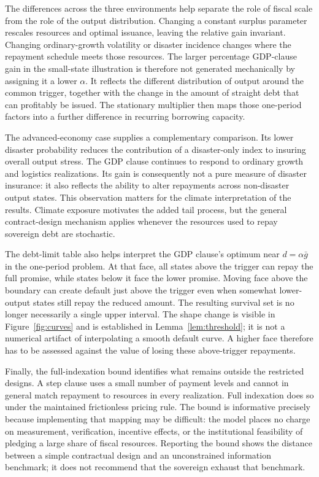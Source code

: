 The differences across the three environments help separate the role of fiscal scale from the role of the output distribution. Changing a constant surplus parameter rescales resources and optimal issuance, leaving the relative gain invariant. Changing ordinary-growth volatility or disaster incidence changes where the repayment schedule meets those resources. The larger percentage GDP-clause gain in the small-state illustration is therefore not generated mechanically by assigning it a lower $\alpha$. It reflects the different distribution of output around the common trigger, together with the change in the amount of straight debt that can profitably be issued. The stationary multiplier then maps those one-period factors into a further difference in recurring borrowing capacity.

The advanced-economy case supplies a complementary comparison. Its lower disaster probability reduces the contribution of a disaster-only index to insuring overall output stress. The GDP clause continues to respond to ordinary growth and logistics realizations. Its gain is consequently not a pure measure of disaster insurance: it also reflects the ability to alter repayments across non-disaster output states. This observation matters for the climate interpretation of the results. Climate exposure motivates the added tail process, but the general contract-design mechanism applies whenever the resources used to repay sovereign debt are stochastic.

The debt-limit table also helps interpret the GDP clause's optimum near $d=\alpha\bar g$ in the one-period problem. At that face, all states above the trigger can repay the full promise, while states below it face the lower promise. Moving face above the boundary can create default just above the trigger even when somewhat lower-output states still repay the reduced amount. The resulting survival set is no longer necessarily a single upper interval. The shape change is visible in Figure~\ref{fig:curves} and is established in Lemma~\ref{lem:threshold}; it is not a numerical artifact of interpolating a smooth default curve. A higher face therefore has to be assessed against the value of losing these above-trigger repayments.

Finally, the full-indexation bound identifies what remains outside the restricted designs. A step clause uses a small number of payment levels and cannot in general match repayment to resources in every realization. Full indexation does so under the maintained frictionless pricing rule. The bound is informative precisely because implementing that mapping may be difficult: the model places no charge on measurement, verification, incentive effects, or the institutional feasibility of pledging a large share of fiscal resources. Reporting the bound shows the distance between a simple contractual design and an unconstrained information benchmark; it does not recommend that the sovereign exhaust that benchmark.
